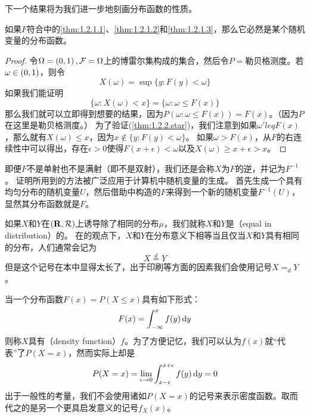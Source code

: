 \documentclass[main.tex]{subfiles}
\begin{document}
下一个结果将为我们进一步地刻画分布函数的性质。

\begin{theorem} \label{thm:1.2.2}
	如果\(F\)符合中的\ref{thm:1.2.1.1}、\ref{thm:1.2.1.2}和\ref{thm:1.2.1.3}，那么它必然是某个随机变量的分布函数。
\end{theorem}
\begin{proof}
	令\(\Omega = \intoo{0,1}, \mathcal{F}=\Omega\)上的博雷尔集构成的集合，然后令\(P=\)勒贝格测度。若\(\omega \in \intoo{0,1}\)，则令
	\[X(\omega) = \sup\{y:F(y) < \omega\}\]
	如果我们能证明
	\[\tag{$\star$}\label{thm:1.2.2.star}\{\omega: X(\omega) < x\} = \{\omega:\omega\leq F(x)\}\]
	那么我们就可以立即得到想要的结果，因为\(P(\omega:\omega\leq F(x)) = F(x)\)。（因为\(P\)在这里是勒贝格测度。）
	为了验证(\ref{thm:1.2.2.star})，我们注意到如果\(\omega'leq F(x)\)，那么就有\(X(\omega) \leq x\)，因为\(x \notin \{y: F(y) < \omega\}\)。
	如果\(\omega > F(x)\)，从\(F\)的右连续性中可以得出，存在\(\epsilon > 0\)使得\(F(x+\epsilon) < \omega\)以及\(X(\omega) \geq x+\epsilon > x\)。
\end{proof}

即便\(F\)不是单射也不是满射（即不是双射），我们还是会称\(X\)为\(F\)的逆，并记为\(F^{-1}\)。
证明所用到的方法被广泛应用于计算机中随机变量的生成。
首先生成一个具有均匀分布的随机变量\(U\)，然后借助中构造的\(F\)来得到一个新的随机变量\(F^{-1}(U)\)，显然其分布函数就是\(F\)。

如果\(X\)和\(Y\)在\((\mathbf{R},\mathcal{R})\)上诱导除了相同的分布\(\mu\)，我们就称\(X\)和\(Y\)是（equal in distribution）的。
在的观点下，\(X\)和\(Y\)在分布意义下相等当且仅当\(X\)和\(Y\)具有相同的分布，人们通常会记为
\[X \stackrel{d}{=} Y\]
但是这个记号在本中显得太长了，出于印刷等方面的因素我们会使用记号\(X =_d Y\)。

当一个分布函数\(F(x) = P(X \leq x)\)具有如下形式：
\begin{equation}\label{eq:1.2.1}
	F(x) = \int_{-\infty}^{x}f(y) \dif y
\end{equation}
则称\(X\)具有（density function）\(f\)。为了方便记忆，我们可以认为\(f(x)\)就``代表''了\(P(X=x)\)，然而实际上却是
\[P(X = x) = \lim\limits_{\epsilon \rightarrow 0}\int_{x-\epsilon}^{x+\epsilon} f(y) \dif y = 0\]
出于一般性的考量，我们不会使用诸如\(P(X=x)\)的记号来表示密度函数。取而代之的是另一个更具启发意义的记号\(f_X(x)\)。
\end{document}
